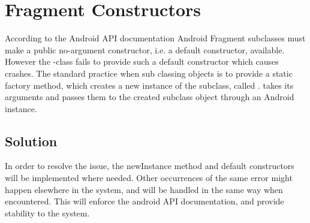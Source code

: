 
\section{Fragment Constructors}
\label{sec:fragment_constructors}

According to the Android API documentation \parencite{android_dev_fragment} Android Fragment subclasses must make a public no-argument constructor, i.e. a default constructor, available. However the \giraf-class  fails to provide such a default constructor which causes crashes. The standard practice when sub classing  objects is to provide a static factory method, which creates a new instance of the  subclass, called .  takes its arguments and passes them to the created  subclass object through an Android  instance. 

\subsection{Solution} 
\label{sub:fragment_constructors_solution}
In order to resolve the issue, the newInstance method and default constructors will be implemented where needed. Other occurrences of the same error might happen elsewhere in the system, and will be handled in the same way when encountered. This will enforce the android API documentation, and provide stability to the system. 